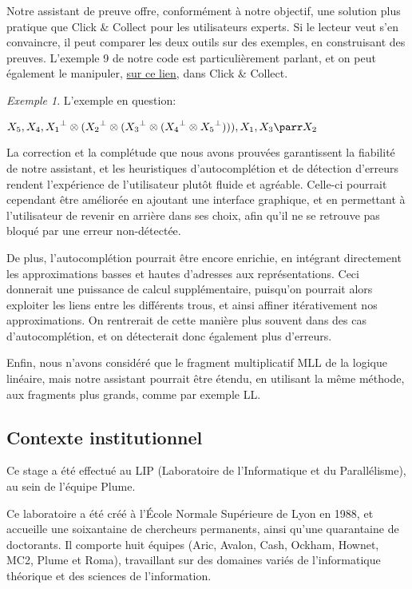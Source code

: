 \documentclass[11pt,a4paper]{article}
\theoremstyle{plain}
\theoremstyle{definition}
\theoremstyle{remark}
\newtheorem{example}{Exemple}
\newcommand*{\orth}{^\perp}
\newcommand*{\tensor}{\otimes}
\begin{document}
Notre assistant de preuve offre, conformément à notre objectif, une solution plus pratique que Click \& Collect pour les utilisateurs experts. Si le lecteur veut s'en convaincre, il peut comparer les deux outils sur des exemples, en construisant des preuves. L'exemple 9 de notre code est particulièrement parlant, et on peut également le manipuler, \href{https://click-and-collect.linear-logic.org/?s=X5%2C+X4%2C+X1%5E+*+%28X2%5E+*+%28X3%5E+*+%28X4%5E+*+X5%5E%29%29%29%2C+X1%2C+X3+%7C+X2}{sur ce lien}, dans Click \& Collect.

\begin{example}
    L'exemple en question:
    
    $X_5, X_4, {X_1}\orth \tensor ({X_2}\orth \tensor ({X_3}\orth \tensor ({X_4}\orth \tensor {X_5}\orth))), X_1, X_3 \parr X_2$
\end{example}

La correction et la complétude que nous avons prouvées garantissent la fiabilité de notre assistant, et les heuristiques d'autocomplétion et de détection d'erreurs rendent l'expérience de l'utilisateur plutôt fluide et agréable. Celle-ci pourrait cependant être améliorée en ajoutant une interface graphique, et en permettant à l'utilisateur de revenir en arrière dans ses choix, afin qu'il ne se retrouve pas bloqué par une erreur non-détectée.

De plus, l'autocomplétion pourrait être encore enrichie, en intégrant directement les approximations basses et hautes d'adresses aux représentations. Ceci donnerait une puissance de calcul supplémentaire, puisqu'on pourrait alors exploiter les liens entre les différents trous, et ainsi affiner itérativement nos approximations. On rentrerait de cette manière plus souvent dans des cas d'autocomplétion, et on détecterait donc également plus d'erreurs.

Enfin, nous n'avons considéré que le fragment multiplicatif MLL de la logique linéaire, mais notre assistant pourrait être étendu, en utilisant la même méthode, aux fragments plus grands, comme par exemple LL.

\printbibliography

\subsection{Contexte institutionnel}
\label{inst_contex}
Ce stage a été effectué au LIP (Laboratoire de l'Informatique et du Parallélisme), au sein de l'équipe Plume. 

Ce laboratoire a été créé à l’École Normale Supérieure de Lyon en 1988, et accueille une soixantaine de chercheurs permanents, ainsi qu'une quarantaine de doctorants. Il comporte huit équipes (Aric, Avalon, Cash, Ockham, Hownet, MC2, Plume et Roma), travaillant sur des domaines variés de l'informatique théorique et des sciences de l'information. 
\end{document}
